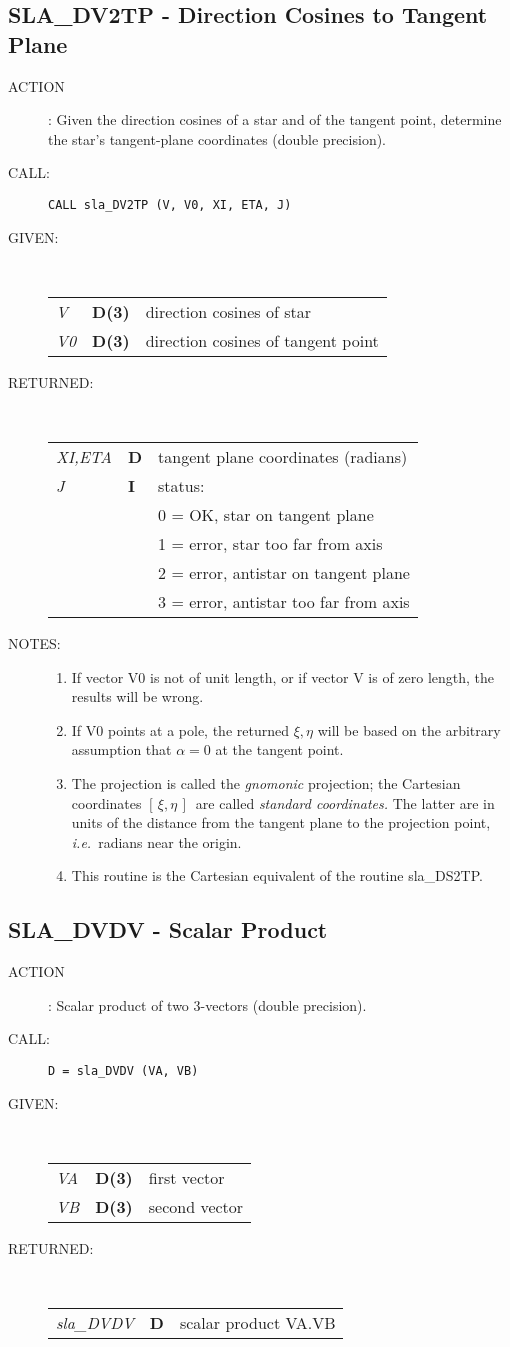 \documentclass[11pt,twoside]{article}
\newcommand{\xlabel}[1]{}
\newcommand{\xieta}     {$[\,\xi,\eta\,]$}
\newcommand{\routine}[3]
{\hbadness=10000
  \vbox
  {
    \rule{\textwidth}{0.3mm}\\
    {\Large {\bf #1} \hfill #2 \hfill {\bf #1}}\\
    \setlength{\oldspacing}{\topsep}
    \setlength{\topsep}{0.3ex}
    \begin{description}
      #3
    \end{description}
    \setlength{\topsep}{\oldspacing}
  }
}
\renewcommand{\routine}[3]
   {
      \subsection{#1\xlabel{#1} - #2\label{#1}}
       \begin{description}
         #3
       \end{description}
   }
\newcommand{\action}[1]
{\item[ACTION]: #1}
\newcommand{\action}[1]
   {\item[ACTION:] #1}
\newcommand{\call}[1]
{\item[CALL]: \hspace{0.4em}{\tt #1}}
\newlength{\oldspacing}
\renewcommand{\call}[1]
   {
    \item[CALL:] {\tt #1}
   }
\newcommand{\args}[2]
{
  \goodbreak
  \setlength{\oldspacing}{\topsep}
  \setlength{\topsep}{0.3ex}
  \begin{description}
  \item[#1]:\\[1.5ex]
    \begin{tabular}{p{7em}p{6em}p{22em}}
      #2
    \end{tabular}
  \end{description}
  \setlength{\topsep}{\oldspacing}
}
\renewcommand{\args}[2]
   {
     \begin{description}
        \item[#1:]\\
        \begin{tabular}{p{7em}p{6em}l}
           #2
        \end{tabular}
     \end{description}
   }
\newcommand{\spec}[3]
{
  {\em {#1}} & {\bf \mbox{#2}} & {#3}
}
\newcommand{\notes}[1]
{
  \goodbreak
  \setlength{\oldspacing}{\topsep}
  \setlength{\topsep}{0.3ex}
  \begin{description}
    \item[NOTES]:
        #1
  \end{description}
  \setlength{\topsep}{\oldspacing}
}
\renewcommand{\notes}[1]
   {
      \begin{description}
         \item[NOTES:]
            #1
      \end{description}
   }
\begin{document}
\routine{SLA\_DV2TP}{Direction Cosines to Tangent Plane}
{
 \action{Given the direction cosines of a star and of the tangent point,
         determine the star's tangent-plane coordinates
         (double precision).}
 \call{CALL sla\_DV2TP (V, V0, XI, ETA, J)}
}
\args{GIVEN}
{
 \spec{V}{D(3)}{direction cosines of star} \\
 \spec{V0}{D(3)}{direction cosines of tangent point}
}
\args{RETURNED}
{
 \spec{XI,ETA}{D}{tangent plane coordinates (radians)} \\
 \spec{J}{I}{status:} \\
 \spec{}{}{\hspace{1.5em} 0 = OK, star on tangent plane} \\
 \spec{}{}{\hspace{1.5em} 1 = error, star too far from axis} \\
 \spec{}{}{\hspace{1.5em} 2 = error, antistar on tangent plane} \\
 \spec{}{}{\hspace{1.5em} 3 = error, antistar too far from axis}
}
\notes
{
 \begin{enumerate}
  \item If vector V0 is not of unit length, or if vector V is of zero
        length, the results will be wrong.
  \item If V0 points at a pole, the returned $\xi,\eta$
        will be based on the
        arbitrary assumption that $\alpha=0$ at the tangent point.
  \item The projection is called the {\it gnomonic}\/ projection;  the
        Cartesian coordinates \xieta\ are called
        {\it standard coordinates.}\/  The latter
        are in units of the distance from the tangent plane to the projection
        point, {\it i.e.}\ radians near the origin.
  \item This routine is the Cartesian equivalent of the routine sla\_DS2TP.
 \end{enumerate}
}
\routine{SLA\_DVDV}{Scalar Product}
{
 \action{Scalar product of two 3-vectors (double precision).}
 \call{D~=~sla\_DVDV (VA, VB)}
}
\args{GIVEN}
{
 \spec{VA}{D(3)}{first vector} \\
 \spec{VB}{D(3)}{second vector}
}
\args{RETURNED}
{
 \spec{sla\_DVDV}{D}{scalar product VA.VB}
}
\end{document}
